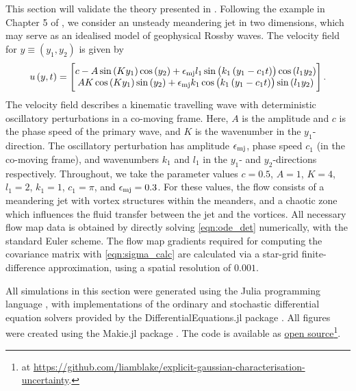 This section will validate the theory presented in .
Following the example in Chapter 5 of \cite{SamelsonWiggins_2006_LagrangianTransportGeophysical}, we consider an unsteady meandering jet in two dimensions, which may serve as an idealised model of geophysical Rossby waves.
The velocity field for \(y \equiv \left(y_1, y_2\right)\) is given by \cite{SamelsonWiggins_2006_LagrangianTransportGeophysical}
\begin{equation}
	u\left(y, t\right) = \begin{bmatrix}
		c - A\sin\left(Ky_1\right)\cos\left(y_2\right) + \epsilon_{\mathrm{mj}} l_1\sin\left(k_1\left(y_1 - c_1 t\right)\right)\cos\left(l_1 y_2\right) \\
		AK\cos\left(Ky_1\right)\sin\left(y_2\right) + \epsilon_{\mathrm{mj}} k_1\cos\left(k_1\left(y_1 - c_1t\right)\right)\sin\left(l_1 y_2\right)
	\end{bmatrix}.
	\label{eqn:jet_ex}
\end{equation}
The velocity field describes a kinematic travelling wave with deterministic oscillatory perturbations in a co-moving frame.
Here, \(A\) is the amplitude and \(c\) is the phase speed of the primary wave, and \(K\) is the wavenumber in the \(y_1\)-direction.
The oscillatory perturbation has amplitude \(\epsilon_{\mathrm{mj}}\), phase speed \(c_1\) (in the co-moving frame), and wavenumbers \(k_1\) and \(l_1\) in the \(y_1\)- and \(y_2\)-directions respectively.
Throughout, we take the parameter values \(c = 0.5\), \(A = 1\), \(K = 4\), \(l_1 = 2\), \(k_1 = 1\), \(c_1 = \pi\), and \(\epsilon_{\mathrm{mj}} = 0.3\).
For these values, the flow consists of a meandering jet with vortex structures within the meanders, and a chaotic zone
which influences the fluid transfer between the jet and the vortices.
All necessary flow map data is obtained by directly solving \eqref{eqn:ode_det} numerically, with the standard Euler scheme.
The flow map gradients required for computing the covariance matrix with \eqref{eqn:sigma_calc} are calculated via a star-grid finite-difference approximation, using a spatial resolution of \(0.001\).

All simulations in this section were generated using the Julia programming language \cite{BezansonEtAl_2017_JuliaFreshApproach}, with implementations of the ordinary and stochastic differential equation solvers provided by the DifferentialEquations.jl package \cite{RackauckasNie_2017_DifferentialEquationsJlPerformant}.
All figures were created using the Makie.jl package \cite{DanischKrumbiegel_2021_MakieJlFlexible}.
The code is available as  \href{https://github.com/liamblake/explicit-gaussian-characterisation-uncertainty}{open source}\footnote{at \url{https://github.com/liamblake/explicit-gaussian-characterisation-uncertainty}.}.


